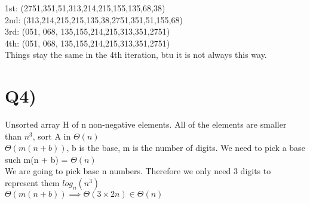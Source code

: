 \documentclass[12pt]{article}
\begin{document}
	1st: (2751,351,51,313,214,215,155,135,68,38)\\
	2nd: (313,214,215,215,135,38,2751,351,51,155,68)\\
	3rd: (051, 068, 135,155,214,215,313,351,2751)\\
	4th: (051, 068, 135,155,214,215,313,351,2751)\\
	Things stay the same in the 4th iteration, btu it is not always this way.\\
	
	\section{Q4)}
	Unsorted array H of n non-negative elements. All of the elements are smaller than $n^3$, sort A in $\Theta(n)$\\
	
	$\Theta(m(n+b))$, b is the base, m is the number of digits. We need to pick a base such m(n + b) = $\Theta(n)$\\
	
	We are going to pick base n numbers. Therefore we only need 3 digits to represent them $log_n(n^3)$\\
	
	$\Theta(m(n + b)) \implies \Theta(3 \times 2n) \in \Theta(n)$\\
	
	
\end{document}
